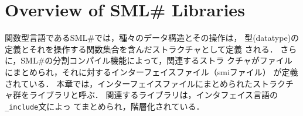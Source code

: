 \documentclass{jbook}
\newcommand{\txt}[2]{#2}
\newcommand{\smlsharp}{SML\#}
\newcommand{\code}[1]{\mbox{\large\tt #1}}
\begin{document}
% 
% 
% 


% 
\chapter{\txt{\smlsharp{}のライブラリ概要}{Overview of \smlsharp{} Libraries}}
\label{chap:reference:library}

\ifjp%
	関数型言語である\smlsharp{}では，種々のデータ構造とその操作は，
型(datatype)の定義とそれを操作する関数集合を含んだストラクチャとして定義
される．
	さらに，\smlsharp{}の分割コンパイル機能によって，関連するストラ
クチャがファイルにまとめられ，それに対するインターフェイスファイル（smiファイル）
が定義されている．
	本章では，インターフェイスファイルにまとめられたストラクチャ群をライブラリと呼ぶ．
	関連するライブラリは，インタフェイス言語の\code{\_include}文によっ
てまとめられ，階層化されている．
\end{document}
